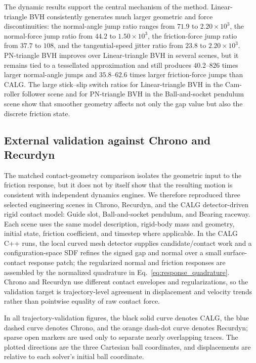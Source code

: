 \documentclass[preprint,12pt]{elsarticle}
\newcommand{\calg}{\textsc{CALG}}
\begin{document}
The dynamic results support the central mechanism of the method. Linear-triangle BVH consistently generates much larger geometric and force discontinuities: the normal-angle jump ratio ranges from $71.9$ to $2.20\times10^3$, the normal-force jump ratio from $44.2$ to $1.50\times10^3$, the friction-force jump ratio from $37.7$ to $108$, and the tangential-speed jitter ratio from $23.8$ to $2.20\times10^3$. PN-triangle BVH improves over Linear-triangle BVH in several scenes, but it remains tied to a tessellated approximation and still produces $40.2$--$826$ times larger normal-angle jumps and $35.8$--$62.6$ times larger friction-force jumps than \calg{}. The large stick--slip switch ratios for Linear-triangle BVH in the Cam-roller follower scene and for PN-triangle BVH in the Ball-and-socket pendulum scene show that smoother geometry affects not only the gap value but also the discrete friction state.

\subsection{External validation against Chrono and Recurdyn}

The matched contact-geometry comparison isolates the geometric input to the friction response, but it does not by itself show that the resulting motion is consistent with independent dynamics engines. We therefore reproduced three selected engineering scenes in Chrono, Recurdyn, and the \calg{} detector-driven rigid contact model: Guide slot, Ball-and-socket pendulum, and Bearing raceway. Each scene uses the same model description, rigid-body mass and geometry, initial state, friction coefficient, and timestep where applicable. In the \calg{} C++ runs, the local curved mesh detector supplies candidate/contact work and a configuration-space SDF refines the signed gap and normal over a small surface-contact response patch; the regularized normal and friction responses are assembled by the normalized quadrature in Eq.~\eqref{eq:response_quadrature}. Chrono and Recurdyn use different contact envelopes and regularizations, so the validation target is trajectory-level agreement in displacement and velocity trends rather than pointwise equality of raw contact force.

In all trajectory-validation figures, the black solid curve denotes \calg{}, the blue dashed curve denotes Chrono, and the orange dash-dot curve denotes Recurdyn; sparse open markers are used only to separate nearly overlapping traces. The plotted directions are the three Cartesian ball coordinates, and displacements are relative to each solver's initial ball coordinate.
\end{document}
